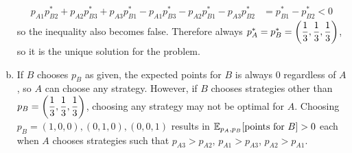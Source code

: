 \documentclass[10pt]{article}
\begin{document}
\begin{enumerate}[(a)]
\begin{align*}
        p_{A1}p_{B2}^* + p_{A2}p_{B3}^* + p_{A3}p_{B1}^* - p_{A1}p_{B3}^* - p_{A2}p_{B1}^* - p_{A3}p_{B2}^* &= p_{B1}^* - p_{B2}^* < 0
    \end{align*}
    so the inequality also becomes false. 
    Therefore always $p_A^* = p_B^* = \qty(\dfrac{1}{3}, \dfrac{1}{3}, \dfrac{1}{3})$, so it is the unique solution for the problem.
    \item If $B$ chooses $p_B$ as given, the expected points for $B$ is always 0 regardless of $A$, so $A$ can choose any strategy.
    However, if $B$ chooses strategies other than $p_B = \qty(\dfrac{1}{3}, \dfrac{1}{3}, \dfrac{1}{3})$, choosing any strategy may not be optimal for $A$.
    Choosing $p_B = (1, 0, 0), (0, 1, 0), (0, 0, 1)$ results in $\mathbb{E}_{p_A, p_B}\qty[\text{points for }B] > 0$ each when $A$ chooses strategies such that $p_{A3} > p_{A2}$, $p_{A1} > p_{A3}$, $p_{A2} > p_{A1}$.
\end{enumerate}
\end{document}
